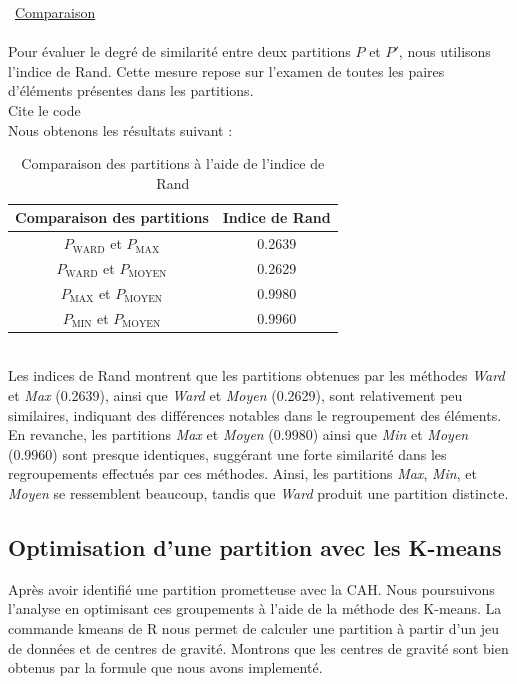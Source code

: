 \documentclass{article}
\begin{document}
\textbullet\ \underline{Comparaison}
\\\\
Pour évaluer le degré de similarité entre deux partitions \( P \) et \( P' \), nous utilisons l'indice de Rand. Cette mesure repose sur l'examen de toutes les paires d'éléments présentes dans les partitions.
\\
Cite le code
\\
Nous obtenons les résultats suivant :
\begin{table}[ht]
    \centering
    \begin{tabular}{|c|c|}
    \hline
    \textbf{Comparaison des partitions} & \textbf{Indice de Rand} \\
    \hline
    \( P_{\text{WARD}} \) et \( P_{\text{MAX}} \) & 0.2639 \\
    \( P_{\text{WARD}} \) et \( P_{\text{MOYEN}} \) & 0.2629 \\
    \( P_{\text{MAX}} \) et \( P_{\text{MOYEN}} \) & 0.9980 \\
    \( P_{\text{MIN}} \) et \( P_{\text{MOYEN}} \) & 0.9960 \\
    \hline
    \end{tabular}
    \caption{Comparaison des partitions à l'aide de l'indice de Rand}
    \end{table}
\\
Les indices de Rand montrent que les partitions obtenues par les méthodes \textit{Ward} et \textit{Max} (0.2639), ainsi que \textit{Ward} et \textit{Moyen} (0.2629), sont relativement peu similaires, indiquant des différences notables dans le regroupement des éléments. En revanche, les partitions \textit{Max} et \textit{Moyen} (0.9980) ainsi que \textit{Min} et \textit{Moyen} (0.9960) sont presque identiques, suggérant une forte similarité dans les regroupements effectués par ces méthodes. Ainsi, les partitions \textit{Max}, \textit{Min}, et \textit{Moyen} se ressemblent beaucoup, tandis que \textit{Ward} produit une partition distincte.



\subsection{Optimisation d'une partition avec les K-means}
Après avoir identifié une partition prometteuse avec la CAH. Nous poursuivons l'analyse en optimisant ces groupements à l'aide de la méthode des K-means. 
La commande kmeans de R nous permet de calculer une partition à partir d'un jeu de 
données et de centres de gravité. Montrons que les centres de gravité sont bien obtenus par la formule que nous avons implementé.
\end{document}

